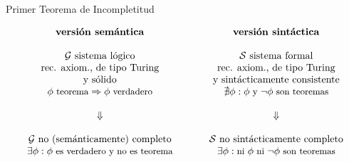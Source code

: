 \documentclass[10pt,xcolor=dvipsnames,aspectratio=169,spanish]{beamer}
\begin{document}
\begin{frame}{Primer Teorema de Incompletitud}

$$
\begin{array}{ccc}
    {
        \begin{matrix}
            \text{\textbf{versión semántica}} \\
            \small{\;}
        \end{matrix}
    }
    & \;\;\;\;\;\; &
    {
        \begin{matrix}
            \text{\textbf{versión sintáctica}} \\
            \small{\;}
        \end{matrix}
    }
    \\
    {
        \begin{matrix}
            \mathcal{G}\text{ sistema lógico}\\
            \text{rec. axiom., de tipo Turing}\\
            \text{y sólido} \\
            \small{\phi \text{ teorema} \Rightarrow \phi\text{ verdadero}}\\
            \tiny{\;}
        \end{matrix}
    }
    &  & 
    {
        \begin{matrix}
            \mathcal{S}\text{ sistema formal}\\
            \text{rec. axiom., de tipo Turing}\\
            \text{y sintácticamente consistente} \\
            \small{\nexists \phi : \phi\text{ y }\neg\phi \text{ son teoremas}} \\
            \tiny{\;}
        \end{matrix}
    } \\
    \Huge{\Downarrow} & & \Huge{\Downarrow} \\
    {
        \begin{matrix}
            \tiny{\;}\\
            \mathcal{G}\text{ no (semánticamente) completo}\\
            \small{\exists\phi:\phi\text{ es verdadero y no es teorema}}\\[2mm]
        \end{matrix}
    }
    & &
    {
        \begin{matrix}
            \tiny{\;}\\
            \mathcal{S}\text{ no sintácticamente completo}\\
            \small{\exists\phi:\text{ni }\phi\text{ ni }\neg\phi\text{ son teoremas}}\\[2mm]
        \end{matrix}
    }
    \\
\end{array}
$$
\end{frame}
\end{document}
